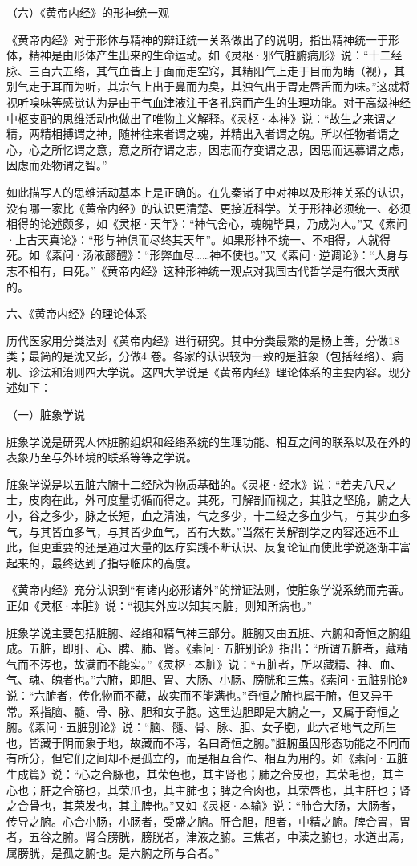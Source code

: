 \documentclass[a4paper,12pt,UTF8,twoside]{ctexbook}
\begin{document}
（六）《黄帝内经》的形神统一观

《黄帝内经》对于形体与精神的辩证统一关系做出了的说明，指出精神统一于形体，精神是由形体产生出来的生命运动。如《灵枢·邪气脏腑病形》说：“十二经脉、三百六五络，其气血皆上于面而走空窍，其精阳气上走于目而为睛（视），其别气走于耳而为听，其宗气上出于鼻而为臭，其浊气出于胃走唇舌而为味。”这就将视听嗅味等感觉认为是由于气血津液注于各孔窍而产生的生理功能。对于高级神经中枢支配的思维活动也做出了唯物主义解释。《灵枢·本神》说：“故生之来谓之精，两精相搏谓之神，随神往来者谓之魂，并精出入者谓之魄。所以任物者谓之心，心之所忆谓之意，意之所存谓之志，因志而存变谓之思，因思而远慕谓之虑，因虑而处物谓之智。”

如此描写人的思维活动基本上是正确的。在先秦诸子中对神以及形神关系的认识，没有哪一家比《黄帝内经》的认识更清楚、更接近科学。关于形神必须统一、必须相得的论述颇多，如《灵枢·天年》：“神气舍心，魂魄毕具，乃成为人。”又《素问·上古天真论》：“形与神俱而尽终其天年”。如果形神不统一、不相得，人就得死。如《素问·汤液醪醴》：“形弊血尽……神不使也。”又《素问·逆调论》：“人身与志不相有，曰死。”《黄帝内经》这种形神统一观点对我国古代哲学是有很大贡献的。

六、《黄帝内经》的理论体系

历代医家用分类法对《黄帝内经》进行研究。其中分类最繁的是杨上善，分做18 类；最简的是沈又彭，分做4 卷。各家的认识较为一致的是脏象（包括经络）、病机、诊法和治则四大学说。这四大学说是《黄帝内经》理论体系的主要内容。现分述如下：

（一）脏象学说

脏象学说是研究人体脏腑组织和经络系统的生理功能、相互之间的联系以及在外的表象乃至与外环境的联系等等之学说。

脏象学说是以五脏六腑十二经脉为物质基础的。《灵枢·经水》说：“若夫八尺之士，皮肉在此，外可度量切循而得之。其死，可解剖而视之，其脏之坚脆，腑之大小，谷之多少，脉之长短，血之清浊，气之多少，十二经之多血少气，与其少血多气，与其皆血多气，与其皆少血气，皆有大数。”当然有关解剖学之内容还远不止此，但更重要的还是通过大量的医疗实践不断认识、反复论证而使此学说逐渐丰富起来的，最终达到了指导临床的高度。

《黄帝内经》充分认识到“有诸内必形诸外”的辩证法则，使脏象学说系统而完善。正如《灵枢·本脏》说：“视其外应以知其内脏，则知所病也。”

脏象学说主要包括脏腑、经络和精气神三部分。脏腑又由五脏、六腑和奇恒之腑组成。五脏，即肝、心、脾、肺、肾。《素问·五脏别论》指出：“所谓五脏者，藏精气而不泻也，故满而不能实。”《灵枢·本脏》说：“五脏者，所以藏精、神、血、气、魂、魄者也。”六腑，即胆、胃、大肠、小肠、膀胱和三焦。《素问·五脏别论》说：“六腑者，传化物而不藏，故实而不能满也。”奇恒之腑也属于腑，但又异于常。系指脑、髓、骨、脉、胆和女子胞。这里边胆即是大腑之一，又属于奇恒之腑。《素问·五脏别论》说：“脑、髓、骨、脉、胆、女子胞，此六者地气之所生也，皆藏于阴而象于地，故藏而不泻，名曰奇恒之腑。”脏腑虽因形态功能之不同而有所分，但它们之间却不是孤立的，而是相互合作、相互为用的。如《素问·五脏生成篇》说：“心之合脉也，其荣色也，其主肾也；肺之合皮也，其荣毛也，其主心也；肝之合筋也，其荣爪也，其主肺也；脾之合肉也，其荣唇也，其主肝也；肾之合骨也，其荣发也，其主脾也。”又如《灵枢·本输》说：“肺合大肠，大肠者，传导之腑。心合小肠，小肠者，受盛之腑。肝合胆，胆者，中精之腑。脾合胃，胃者，五谷之腑。肾合膀胱，膀胱者，津液之腑。三焦者，中渎之腑也，水道出焉，属膀胱，是孤之腑也。是六腑之所与合者。”
\end{document}
